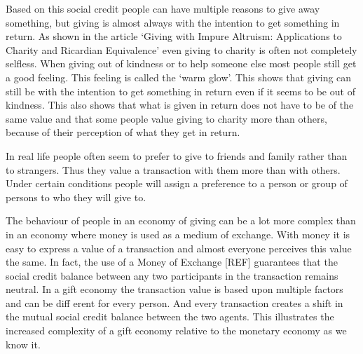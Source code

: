 \documentclass[twoside,openright]{uva-bachelor-thesis}
\begin{document}
Based on this social credit people can have multiple reasons to give away something, but giving is almost always with the intention to get something in return. As shown in the article ‘Giving with Impure Altruism: Applications to Charity and Ricardian Equivalence’ even giving to charity is often not completely selfless. When giving out of kindness or to help someone else most people still get a good feeling. This feeling is called the ‘warm glow’. This shows that giving can still be with the intention to get something in return even if it seems to be out of kindness. This also shows that what is given in return does not have to be of the same value and that some people value giving to charity more than others, because of their perception of what they get in return.

In real life people often seem to prefer to give to friends and family rather than to strangers. Thus they value a transaction with them more than with others. Under certain conditions people will assign a preference to a person or group of persons to who they will give to.

The behaviour of people in an economy of giving can be a lot more complex than in an economy where money is used as a medium of exchange. With money it is easy to express a value of a transaction and almost everyone perceives this value the same. In fact, the use of a Money of Exchange [REF] guarantees that the social credit balance between any two participants in the transaction remains neutral. In a gift economy the transaction value is based upon multiple factors and can be diff erent for every person. And every transaction creates a shift in the mutual social credit balance between the two agents. This illustrates the increased complexity of a gift economy relative to the monetary economy as we know it.
\end{document}
